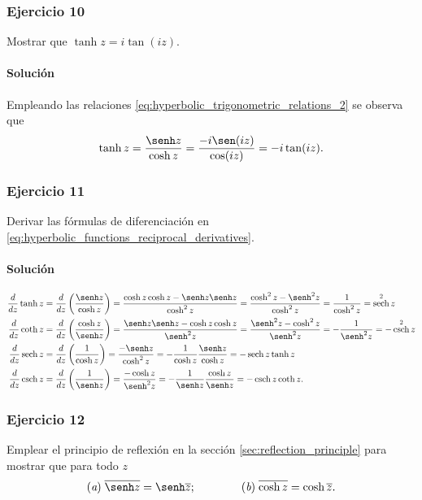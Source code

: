 \documentclass[a4paper]{report}
\DeclareMathOperator{\sech}{sech}
\DeclareMathOperator{\csch}{csch}
\begin{document}
\subsubsection{Ejercicio 10}

Mostrar que \(\tanh z=i\tan(iz)\).

\paragraph{Solución} Empleando las relaciones \ref{eq:hyperbolic_trigonometric_relations_2} se observa que 
\[
 \tanh z=\frac{\senh z}{\cosh z}=\frac{-i\sen(iz)}{\cos(iz)}=-i\tan(iz).
\]

\subsubsection{Ejercicio 11}

Derivar las fórmulas de diferenciación en \ref{eq:hyperbolic_functions_reciprocal_derivatives}.

\paragraph{Solución} 
\begin{align*}
  \frac{d}{dz}\tanh z&=\frac{d}{dz}\left(\frac{\senh z}{\cosh z}\right)=\frac{\cosh z\cosh z-\senh z\senh z}{\cosh^2z}=\frac{\cosh^2z-\senh^2z}{\cosh^2z}=\frac{1}{\cosh^2z}=\sech^2z\\
  \frac{d}{dz}\coth z&=\frac{d}{dz}\left(\frac{\cosh z}{\senh z}\right)=\frac{\senh z\senh z-\cosh z\cosh z}{\senh^2z}=\frac{\senh^2z-\cosh^2z}{\senh^2z}=-\frac{1}{\senh^2z}=-\csch^2z\\ 
  \frac{d}{dz}\sech z&=\frac{d}{dz}\left(\frac{1}{\cosh z}\right)=\frac{-\senh z}{\cosh^2z}=-\frac{1}{\cosh z}\frac{\senh z}{\cosh z}=-\sech z\tanh z\\
  \frac{d}{dz}\csch z&=\frac{d}{dz}\left(\frac{1}{\senh z}\right)=\frac{-\cosh z}{\senh^2z}=-\frac{1}{\senh z}\frac{\cosh z}{\senh z}=-\csch z\coth z. 
\end{align*}

\subsubsection{Ejercicio 12}

Emplear el principio de reflexión en la sección \ref{sec:reflection_principle} para mostrar que para todo \(z\)
\[
 (\textit{a})\;\overline{\senh z}=\senh\overline{z};\qquad\qquad (\textit{b})\;\overline{\cosh z}=\cosh\overline{z}.
\]
\end{document}
